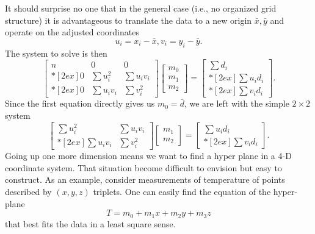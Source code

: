 It should surprise no one that in the general case (i.e., no organized grid structure) it is advantageous to translate 
the data to a new origin $\bar{x},\bar{y}$   and operate on the adjusted coordinates
\begin{equation}
u_i = x_i - \bar{x}, v_i = y_i - \bar{y}	 .
\end{equation}
The system to solve is then
\begin{equation}
\left [ \begin{array}{ccc}
n & 0 & 0 \\*[2ex]
0 & \displaystyle \sum u^2_i & \displaystyle \sum u_iv_i \\*[2ex]
0 & \displaystyle \sum u_i v_i & \displaystyle \sum v^2_i
\end{array} \right ] 
\left [ \begin{array}{c}
m_0\\ m_1\\ m_2 \end{array} \right ] = 
\left[ \begin{array}{c} \displaystyle \sum d_i \\*[2ex] \displaystyle \sum u_i d_i \\*[2ex] \displaystyle \sum v_i d_i \end{array} \right ].
\end{equation}	 
Since the first equation directly gives us $m_0 = \bar{d}$, we are left with the simple $2\times 2$ system
\begin{equation}
\left[ \begin{array}{cc}
\displaystyle \sum u^2_i & \displaystyle \sum u_i v_i \\*[2ex]
\displaystyle \sum u_i  v_i & \displaystyle \sum v^2_i
\end{array} \right ]
\left [ \begin{array}{c}
m_1\\ m_2 \end{array} \right ] = 
\left [ \begin{array}{c}
\displaystyle \sum u_i d_i \\*[2ex]
\displaystyle \sum v_i d_i 
\end{array}
\right ].
\end{equation}
	Going up one more dimension means we want to find a hyper plane in a 4-D coordinate 
system.  That situation become difficult to envision but easy to construct.  As an example, consider 
measurements of temperature of points described by  $(x,y,z)$ triplets.  One can easily find the 
equation of the hyper-plane
\begin{equation}
	T = m_0 + m_1 x + m_2 y + m_3 z
\end{equation}
that best fits the data in a least square sense.

